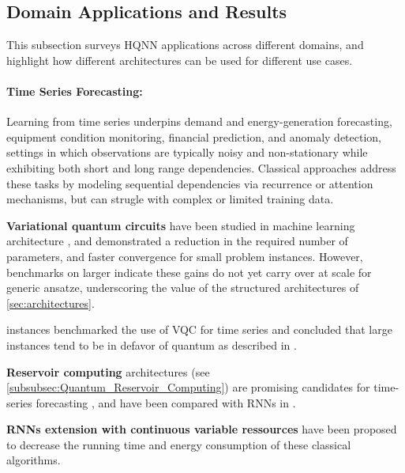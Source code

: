 \documentclass[aps,10pt,groupedaddress,prx,superscriptaddress,twocolumn,balancelastpage, tightenlines]{revtex4-2}
\theoremstyle{plain}  %
\begin{document}
\subsection{Domain Applications and Results}\label{subsec:Domain_App_Results}

This subsection surveys HQNN applications across different domains, and highlight how different architectures can be used for different use cases.  


\paragraph{Time Series Forecasting:} Learning from time series underpins demand and energy-generation forecasting, equipment condition monitoring, financial prediction, and anomaly detection, settings in which observations are typically noisy and non-stationary while exhibiting both short and long range dependencies. Classical approaches \cite{hochreiter1997lstm, eren_comprehensive_2024, serradilla_deep_2022, sezer_financial_2020, zamanzadeh_darban_deep_2024} address these tasks by modeling sequential dependencies via recurrence or attention mechanisms, but can strugle with complex or limited training data. 

\noindent\textbf{Variational quantum circuits} have been studied in machine learning architecture \cite{chen2022qlstm, sagingalieva2025photovoltaic, siemaszko2023cvqrnn, khan2024qlstm_solar, schetakis2025traffic, kurkin2025forecasting, lee2025predictive,su2025blsqlstm, thakkar2024financial}, and demonstrated a reduction in the required number of parameters, and faster convergence for small problem instances. However, benchmarks on larger \cite{fellner_quantum_2026, bowles2024better} indicate these gains do not yet carry over at scale for generic ansatze, underscoring the value of the structured architectures of \autoref{sec:architectures}.


instances\cite{fellner_quantum_2026} benchmarked the use of \gls{VQC} for time series and concluded that large instances tend to be in defavor of quantum as described in \cite{bowles2024better}.

\noindent\textbf{Reservoir computing} architectures (see \autoref{subsubsec:Quantum_Reservoir_Computing}) are promising candidates for time-series forecasting \cite{suzuki_natural_2022, mujal_time-series_2023}, and have been compared with RNNs in \cite{vlachas_backpropagation_2020}.

\noindent\textbf{\glspl{RNN} extension with continuous variable ressources} have been proposed \cite{siemaszko2023cvqrnn} to decrease the running time and energy consumption of these classical algorithms.
\end{document}
